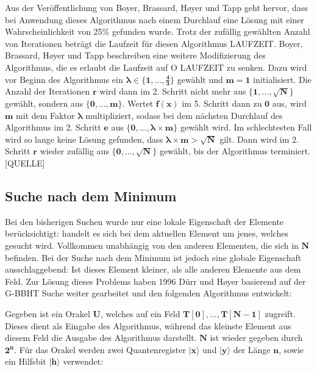 Aus der Veröffentlichung von Boyer, Brassard, Høyer und Tapp geht hervor, dass bei Anwendung dieses Algorithmus nach einem Durchlauf eine Lösung mit einer Wahrscheinlichkeit von 25\% gefunden wurde. 
Trotz der zufällig gewählten Anzahl von Iterationen beträgt die Laufzeit für diesen Algorithmus LAUFZEIT.
Boyer, Brassard, Høyer und Tapp beschreiben eine weitere Modifizierung des Algorithmus, die es erlaubt die Laufzeit auf O LAUFZEIT zu senken. 
Dazu wird vor Beginn des Algorithmus ein $\mathbf{\pmb\lambda \in \{1, ..., \frac{4}{3} \} }$ gewählt und $\mathbf{m = 1}$ initialisiert. Die Anzahl der Iterationen $\mathbf{r}$ wird dann im 2. Schritt nicht mehr aus $\mathbf{\{1, ..., \sqrt{N}\}}$ gewählt, sondern aus $\mathbf{\{0, ..., m\}}$. 
Wertet $\mathbf{f(x)}$ im 5. Schritt dann zu $\mathbf{0}$ aus, wird $\mathbf{m}$ mit dem Faktor $\mathbf{\pmb\lambda}$ multipliziert, sodass bei dem nächsten Durchlauf des Algorithmus im 2. Schritt $\mathbf{e}$ aus $\mathbf{\{0, ..., \pmb\lambda \times m\}}$  gewählt wird. 
Im schlechtesten Fall wird so lange keine Lösung gefunden, dass $\mathbf{\pmb\lambda \times m > \sqrt{N}}$ gilt. Dann wird im 2. Schritt $\mathbf{r}$ wieder zufällig aus $\mathbf{\{0, ..., \sqrt{N}\}}$ gewählt, bis der Algorithmus terminiert. [QUELLE]


\subsection{Suche nach dem Minimum}
Bei den bisherigen Suchen wurde nur eine lokale Eigenschaft der Elemente berücksichtigt: handelt es sich bei dem aktuellen Element um jenes, welches gesucht wird. 
Vollkommen unabhängig von den anderen Elementen, die sich in $\mathbf{N}$ befinden. Bei der Suche nach dem Minimum ist jedoch eine globale Eigenschaft ausschlaggebend: Ist dieses Element kleiner, als alle anderen Elemente aus dem Feld.
Zur Lösung dieses Problems haben 1996 Dürr und Høyer basierend auf der G-BBHT Suche weiter gearbeitet und den folgenden Algorithmus entwickelt: 

Gegeben ist ein Orakel $\mathbf{U}$, welches auf ein Feld $\mathbf{T[0], ..., T[N-1]}$ zugreift. 
Dieses dient als Eingabe des Algorithmus, während das kleinste Element aus diesem Feld die Ausgabe des Algorithmus darstellt. $\mathbf{N}$ ist wieder gegeben durch $\mathbf{2^n}$. 
Für das Orakel werden zwei Quantenregister $\mathbf{|x\rangle}$ und $\mathbf{|y\rangle}$ der Länge $\mathbf{n}$, sowie ein Hilfsbit $\mathbf{|h\rangle}$ verwendet:

